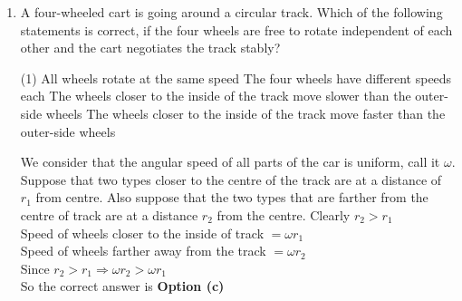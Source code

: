 \begin{enumerate}
\begin{answer}
\begin{align*}
{		Mehul's house Karan house is in the South-East direction.
		None of the given options have this answer. So all of them are wrong.}
	\end{align*}
		So the correct answer is \textbf{Option (b)}
\end{answer}
\item A four-wheeled cart is going around a circular track. Which of the following statements is correct, if the four wheels are free to rotate independent of each other and the cart negotiates the track stably?
 \begin{tasks}(1)
	\task[\textbf{a.}] All wheels rotate at the same speed
	\task[\textbf{b.}] The four wheels have different speeds each
	\task[\textbf{c.}]The wheels closer to the inside of the track move slower than the outer-side wheels
	\task[\textbf{d.}]The wheels closer to the inside of the track move faster than the outer-side wheels	 
\end{tasks}	
\begin{answer}
 We consider that the angular speed of all parts of the car is uniform, call it $\omega$.\\
		Suppose that two types closer to the centre of the track are at a distance of $r_{1}$ from centre.
		Also suppose that the two types that are farther from the centre of track are at a distance $r_{2}$ from the centre. Clearly $r_{2}>r_{1}$\\
	Speed of wheels closer to the inside of track $=\omega r_{1}$\\
	Speed of wheels farther away from the track $=\omega r_{2}$\\
	Since $r_{2}>r_{1} \Rightarrow \omega r_{2}>\omega r_{1}$\\
			So the correct answer is \textbf{Option (c)}
\end{answer}

\end{enumerate}
